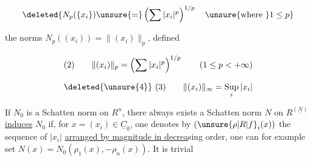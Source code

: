 \[
\deleted{N_p(\{x_i\})\unsure{=}\left(\sum |x_i|^p\right)^{1/p}\quad\text{\unsure{where }}1\leq p}
\]

the norms $N_p((x_i))=\lVert(x_i)\rVert_p$, defined  

{\reversemarginpar{}}
\[
\begin{array}{@{}l@{\qquad}l@{}}
(2)&\displaystyle \lVert(x_i)\rVert_p=\left(\sum |x_i|^p\right)^{1/p}\qquad (1\leq p<+\infty)
\end{array}
\]

\[
\begin{array}{@{}l@{\qquad}l@{}}
\deleted{\unsure{4}}\ (3)&\displaystyle \lVert(x_i)\rVert_\infty=\underset{i}{\operatorname{Sup}}\,|x_i|
\end{array}
\]

{\reversemarginpar{}}
If $N_0$ is a Schatten norm  on $R^n$, there always exists a Schatten norm $N$ on $R^{(\underline N)}$ 
{\reversemarginpar{}}
{\color{red}\uline{\color{black}induces}} $N_0$ if, for  $x=(x_i)\in\underline{C}_0$, one denotes by
{\reversemarginpar{}}
$(\unsure{\rho|R|f}_i(x))$ the sequence of  $|x_i|$ 
{\color{red}\uline{\color{black}arranged by magnitude in decrea}}sing order, one can for example set $N(x)=N_0(\rho_1(x),\mathord{-}\rho_n(x))$. It is trivial

{\reversemarginpar{}}
